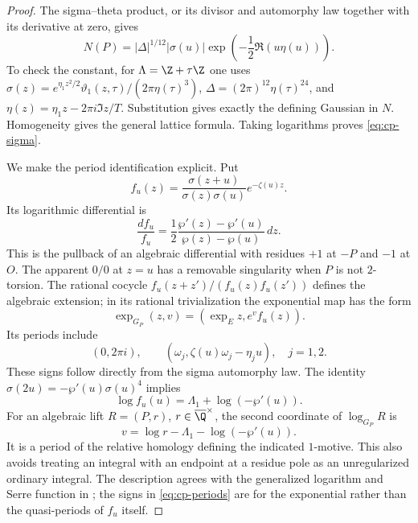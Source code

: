\begin{proof}
The sigma--theta product, or its divisor and automorphy law
together with its derivative at zero, gives
\begin{equation}\label{eq:cp-klein}
 N(P)=|\Delta|^{1/12}|\sigma(u)|
                   \exp\!\left(-\frac12\Re(u\eta(u))\right).
\end{equation}
To check the constant, for $\Lambda=\Z+\tau\Z$ one uses
$\sigma(z)=e^{\eta_1z^2/2}\vartheta_1(z,\tau)/(2\pi\eta(\tau)^3)$,
$\Delta=(2\pi)^{12}\eta(\tau)^{24}$, and
$\eta(z)=\eta_1z-2\pi i\Im z/T$. Substitution gives exactly
the defining Gaussian in $N$. Homogeneity gives the general
lattice formula. Taking logarithms proves \eqref{eq:cp-sigma}.

We make the period identification explicit. Put
\[
 f_u(z)=\frac{\sigma(z+u)}{\sigma(z)\sigma(u)}e^{-\zeta(u)z}.
\]
Its logarithmic differential is
\[
 \frac{df_u}{f_u}
 =\frac12\frac{\wp'(z)-\wp'(u)}{\wp(z)-\wp(u)}\,dz.
\]
This is the pullback of an algebraic differential with residues
$+1$ at $-P$ and $-1$ at $O$. The apparent $0/0$ at $z=u$
has a removable singularity when $P$ is not $2$-torsion.
The rational cocycle $f_u(z+z')/(f_u(z)f_u(z'))$ defines
the algebraic extension; in its rational trivialization the
exponential map has the form
\[
 \exp_{G_P}(z,v)=(\exp_E z,e^v f_u(z)).
\]
Its periods include
\begin{equation}\label{eq:cp-periods}
 (0,2\pi i),\qquad
 (\omega_j,\zeta(u)\omega_j-\eta_j u),\quad j=1,2.
\end{equation}
These signs follow directly from the sigma automorphy law.
The identity
$\sigma(2u)=-\wp'(u)\sigma(u)^4$ implies
\[
 \log f_u(u)=\Lambda_1+\log(-\wp'(u)).
\]
For an algebraic lift $R=(P,r)$, $r\in\overline\Q^{\times}$,
the second coordinate of $\log_{G_P}R$ is
\begin{equation}\label{eq:cp-v}
 v=\log r-\Lambda_1-\log(-\wp'(u)).
\end{equation}
It is a period of the relative homology defining the indicated
$1$-motive. This also avoids treating an integral with an endpoint
at a residue pole as an unregularized ordinary integral.
The description agrees with the generalized logarithm and
Serre function in \citet[Definitions 2.3--2.4 and
Section 6]{bertolin2022}; the signs in
\eqref{eq:cp-periods} are for the exponential rather than the
quasi-periods of $f_u$ itself.
\end{proof}
